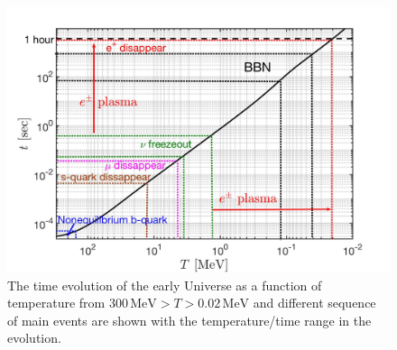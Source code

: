 \begin{figure}[ht]
 \centerline{\includegraphics[width=\textwidth,width=\linewidth]{./plots/CosmicTimeTemperature_Project}}
 \caption{The time evolution of the early Universe as a function of temperature from $300\,\mathrm{MeV}>T>0.02\,\mathrm{MeV}$ and 
 different sequence of main events are shown with the temperature/time range in the evolution. }
 \label{Overview_fig}
\end{figure}

